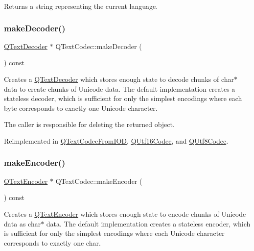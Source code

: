 Returns a string representing the current language. \mbox{\label{class_q_text_codec_abb65882aa316a2ad49a10e9f86c4dc88}} 
\subsubsection{\texorpdfstring{makeDecoder()}{makeDecoder()}}
{\footnotesize\ttfamily \mbox{\hyperlink{class_q_text_decoder}{Q\+Text\+Decoder}} $\ast$ Q\+Text\+Codec\+::make\+Decoder (\begin{DoxyParamCaption}{ }\end{DoxyParamCaption}) const\hspace{0.3cm}{\ttfamily [virtual]}}

Creates a \mbox{\hyperlink{class_q_text_decoder}{Q\+Text\+Decoder}} which stores enough state to decode chunks of char$\ast$ data to create chunks of Unicode data. The default implementation creates a stateless decoder, which is sufficient for only the simplest encodings where each byte corresponds to exactly one Unicode character.

The caller is responsible for deleting the returned object. 

Reimplemented in \mbox{\hyperlink{class_q_text_codec_from_i_o_d_ae5184561209ee0771ad28d3888a2a89c}{Q\+Text\+Codec\+From\+I\+OD}}, \mbox{\hyperlink{class_q_utf16_codec_a1134a8f386ac3b775ad60381e373d28a}{Q\+Utf16\+Codec}}, and \mbox{\hyperlink{class_q_utf8_codec_a0e08549580abc7270123937115f746c8}{Q\+Utf8\+Codec}}.

\mbox{\label{class_q_text_codec_aa7dccd7fc1b578de0b7599b040d98e11}} 
\subsubsection{\texorpdfstring{makeEncoder()}{makeEncoder()}}
{\footnotesize\ttfamily \mbox{\hyperlink{class_q_text_encoder}{Q\+Text\+Encoder}} $\ast$ Q\+Text\+Codec\+::make\+Encoder (\begin{DoxyParamCaption}{ }\end{DoxyParamCaption}) const\hspace{0.3cm}{\ttfamily [virtual]}}

Creates a \mbox{\hyperlink{class_q_text_encoder}{Q\+Text\+Encoder}} which stores enough state to encode chunks of Unicode data as char$\ast$ data. The default implementation creates a stateless encoder, which is sufficient for only the simplest encodings where each Unicode character corresponds to exactly one char.

